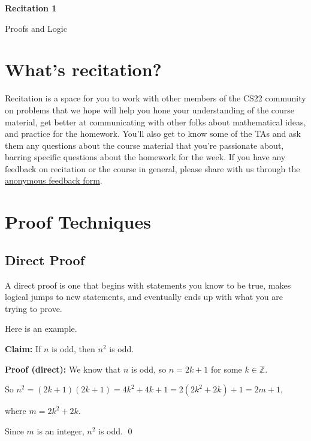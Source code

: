 \documentclass[12pt,letterpaper]{article}
\newcommand\Z{\mathbb Z}
\begin{document}
  \thispagestyle{firstpagestyle}
  \begin{center}
    {\large \textbf{Recitation 1}}
    
    {\large Proofs and Logic}
  \end{center}
  
    \section*{What's recitation?}
    
    Recitation is a space for you to work with other members of the CS22 community on problems that we hope will help you hone your understanding of the course material, get better at communicating with other folks about mathematical ideas, and practice for the homework. You'll also get to know some of the TAs and ask them any questions about the course material that you're passionate about, barring specific questions about the homework for the week. If you have any feedback on recitation or the course in general, please share with us through the \href{https://docs.google.com/forms/d/e/1FAIpqLSfq3do7_irvrtC_f-1zxwq3f-Ro17K_P6lAiRa78OSeHkYoGw/viewform}{anonymous feedback form}.

      \section*{Proof Techniques}

      \subsection*{Direct Proof}

      A direct proof is one that begins with statements you know to be true, makes logical jumps to new statements, and eventually ends up with what you are trying to prove.

      Here is an example. 

      \textbf{Claim:} If $n$ is odd, then $n^2$ is odd.

      \textbf{Proof (direct):} We know that $n$ is odd, so $n = 2k + 1$ for some $k \in \Z$.

      So $n^2 = (2k+1)(2k+1) = 4k^2 + 4k + 1 = 2(2k^2 + 2k) + 1 = 2m+1$,

      where $m =  2k^2 + 2k$.

      Since $m$ is an integer, $n^2$ is odd. \qed
\end{document}
